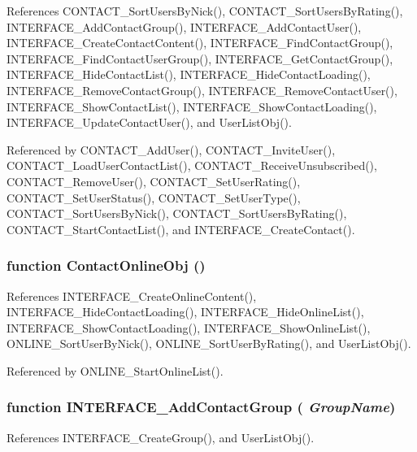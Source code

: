References CONTACT\_\-SortUsersByNick(), CONTACT\_\-SortUsersByRating(), INTERFACE\_\-AddContactGroup(), INTERFACE\_\-AddContactUser(), INTERFACE\_\-CreateContactContent(), INTERFACE\_\-FindContactGroup(), INTERFACE\_\-FindContactUserGroup(), INTERFACE\_\-GetContactGroup(), INTERFACE\_\-HideContactList(), INTERFACE\_\-HideContactLoading(), INTERFACE\_\-RemoveContactGroup(), INTERFACE\_\-RemoveContactUser(), INTERFACE\_\-ShowContactList(), INTERFACE\_\-ShowContactLoading(), INTERFACE\_\-UpdateContactUser(), and UserListObj().

Referenced by CONTACT\_\-AddUser(), CONTACT\_\-InviteUser(), CONTACT\_\-LoadUserContactList(), CONTACT\_\-ReceiveUnsubscribed(), CONTACT\_\-RemoveUser(), CONTACT\_\-SetUserRating(), CONTACT\_\-SetUserStatus(), CONTACT\_\-SetUserType(), CONTACT\_\-SortUsersByNick(), CONTACT\_\-SortUsersByRating(), CONTACT\_\-StartContactList(), and INTERFACE\_\-CreateContact().
\subsubsection[ContactOnlineObj]{\setlength{\rightskip}{0pt plus 5cm}function ContactOnlineObj ()}\label{interface_2contact_8js_8ecce5de98dc2f1b4dc46123cb05e381}




References INTERFACE\_\-CreateOnlineContent(), INTERFACE\_\-HideContactLoading(), INTERFACE\_\-HideOnlineList(), INTERFACE\_\-ShowContactLoading(), INTERFACE\_\-ShowOnlineList(), ONLINE\_\-SortUserByNick(), ONLINE\_\-SortUserByRating(), and UserListObj().

Referenced by ONLINE\_\-StartOnlineList().
\subsubsection[INTERFACE\_\-AddContactGroup]{\setlength{\rightskip}{0pt plus 5cm}function INTERFACE\_\-AddContactGroup ( {\em GroupName})}\label{interface_2contact_8js_6be0e69248e5f0d6357215497a88cf7b}




References INTERFACE\_\-CreateGroup(), and UserListObj().

